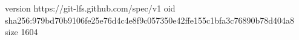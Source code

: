 version https://git-lfs.github.com/spec/v1
oid sha256:979bd70b9106fe25e76d4c4e8f9c057350e42ffe155c1bfa3c76890b78d404a8
size 1604
